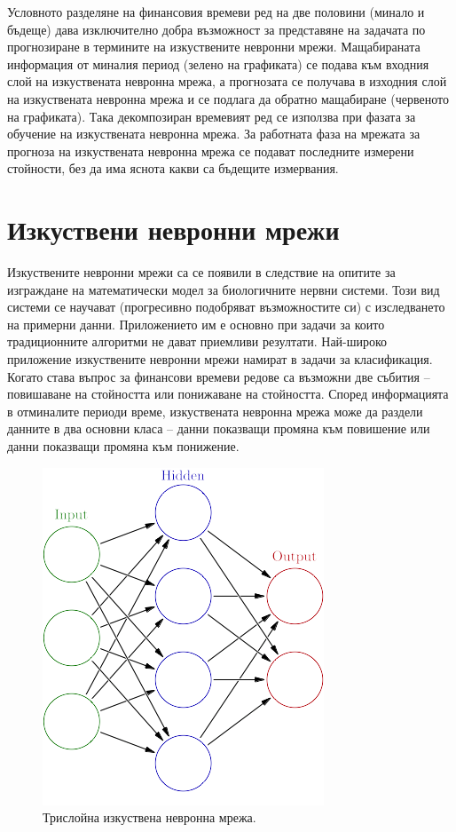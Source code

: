 \documentclass[book,14pt,oneside,openany]{memoir}
\begin{document}
Условното разделяне на финансовия времеви ред на две половини (минало и бъдеще) дава изключително добра възможност за представяне на задачата по прогнозиране в термините на изкуствените невронни мрежи. Мащабираната информация от миналия период (зелено на графиката) се подава към входния слой на изкуствената невронна мрежа, а прогнозата се получава в изходния слой на изкуствената невронна мрежа и се подлага да обратно мащабиране (червеното на графиката). Така декомпозиран времевият ред се използва при фазата за обучение на изкуствената невронна мрежа. За работната фаза на мрежата за прогноза на изкуствената невронна мрежа се подават последните измерени стойности, без да има яснота какви са бъдещите измервания. 

\section{Изкуствени невронни мрежи}

Изкуствените невронни мрежи са се появили в следствие на опитите за изграждане на математически модел за биологичните нервни системи. Този вид системи се научават (прогресивно подобряват възможностите си) с изследването на примерни данни. Приложението им е основно при задачи за които традиционните алгоритми не дават приемливи резултати. Най-широко приложение изкуствените невронни мрежи намират в задачи за класификация. Когато става въпрос за финансови времеви редове са възможни две събития – повишаване на стойността или понижаване на стойността. Според информацията в отминалите периоди време, изкуствената невронна мрежа може да раздели данните в два основни класа – данни показващи промяна към повишение или данни показващи промяна към понижение. 

\begin{figure}[h!]
  \centering
  \includegraphics[height=0.25\pdfpageheight]{./images/pic0004.png}
  \caption{Трислойна изкуствена невронна мрежа.}
\label{fig:pic0004}
\end{figure}
\end{document}
